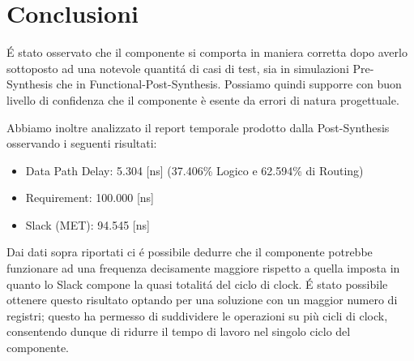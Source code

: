 \newpage
\section{Conclusioni}
\label{Conclusione}
É stato osservato che il componente si comporta in maniera corretta dopo averlo sottoposto ad una notevole quantitá di casi di test, sia in simulazioni Pre-Synthesis che in Functional-Post-Synthesis. Possiamo quindi supporre con buon livello di confidenza che il componente è esente da errori di natura progettuale.

Abbiamo inoltre analizzato il report temporale prodotto dalla Post-Synthesis osservando i seguenti risultati:

\begin{itemize}
    \item Data Path Delay:  5.304 [ns]   (37.406\% Logico e 62.594\% di Routing)
    \item Requirement:  100.000 [ns] 
    \item Slack (MET):  94.545 [ns] 
\end{itemize}

Dai dati sopra riportati ci é possibile dedurre che il componente potrebbe funzionare ad una frequenza decisamente maggiore rispetto a quella imposta in quanto lo Slack compone la quasi totalitá del ciclo di clock.
É stato possibile ottenere questo risultato optando per una soluzione con un maggior numero di registri; questo ha permesso di suddividere le operazioni su più cicli di clock, consentendo dunque di ridurre il tempo di lavoro nel singolo ciclo del componente.



